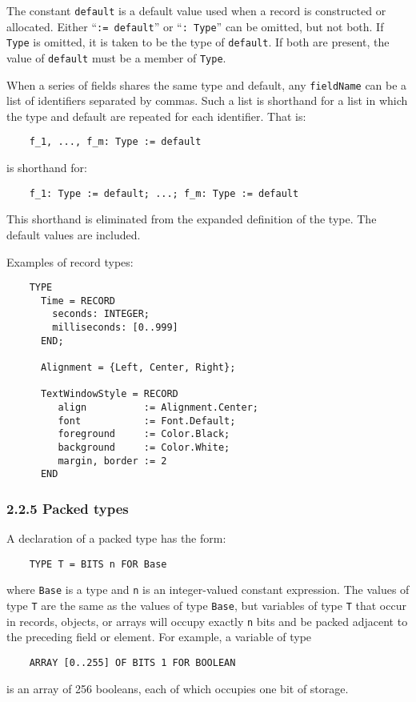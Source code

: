 \documentclass[10pt]{article}
\begin{document}
The constant \verb|default| is a default value used when a record is
constructed or allocated.  Either ``\verb|:= default|'' or ``\verb|: Type|''
can be omitted, but not both.  If \verb|Type| is omitted, it is taken to be
the type of \verb|default|.  If both are present, the value of \verb|default|
must be a member of \verb|Type|.

When a series of fields shares the same type and default, any \verb|fieldName|
can be a list of identifiers separated by commas.  Such a list is shorthand
for a list in which the type and default are repeated for each identifier.
That is:
\begin{verbatim}
    f_1, ..., f_m: Type := default
\end{verbatim}
is shorthand for:
\begin{verbatim}
    f_1: Type := default; ...; f_m: Type := default
\end{verbatim}
This shorthand is eliminated from the expanded definition of the type.  The
default values are included.

Examples of record types:
\begin{verbatim}
    TYPE
      Time = RECORD
        seconds: INTEGER;
        milliseconds: [0..999]
      END;

      Alignment = {Left, Center, Right};

      TextWindowStyle = RECORD
         align          := Alignment.Center;
         font           := Font.Default;
         foreground     := Color.Black;
         background     := Color.White;
         margin, border := 2
      END
\end{verbatim}

\subsubsection*{2.2.5 Packed types}

A declaration of a packed type has the form:
\begin{verbatim}
    TYPE T = BITS n FOR Base
\end{verbatim}
where \verb|Base| is a type and \verb|n| is an integer-valued constant
expression.  The values of type \verb|T| are the same as the values of type
\verb|Base|, but variables of type \verb|T| that occur in records, objects, or
arrays will occupy exactly \verb|n| bits and be packed adjacent to the
preceding field or element.  For example, a variable of type
\begin{verbatim}
    ARRAY [0..255] OF BITS 1 FOR BOOLEAN
\end{verbatim}
is an array of 256 booleans, each of which occupies one bit of storage.
\end{document}
